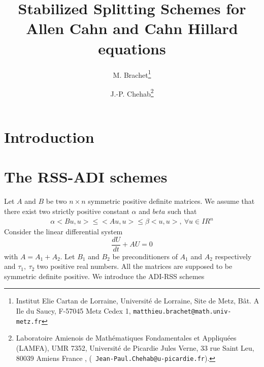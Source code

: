 \documentclass[11pt]{article}
\newcommand{\R}{I\!\!R}
\newcommand{\Frac}[2] {\frac{\textstyle #1} {\textstyle #2}}
\begin{document}
\title{Stabilized Splitting Schemes for Allen Cahn and Cahn Hillard equations}
\author{M. Brachet\thanks{Institut Elie Cartan de Lorraine, Universit\'e de Lorraine, Site de Metz, B\^at. A Ile du Saucy, F-57045 Metz Cedex 1, {\tt matthieu.brachet@math.univ-metz.fr}} \and J.-P. Chehab\thanks{
Laboratoire Amienois de Math\'ematiques Fondamentales et Appliqu\'ees (LAMFA), {\small UMR} 7352,
 Universit\'e de Picardie Jules Verne, 33 rue Saint Leu, 80039 Amiens France
 , ({\tt
 Jean-Paul.Chehab@u-picardie.fr}).} }




\maketitle

%
%



\begin{abstract}
\end{abstract}
\section{Introduction}
\section{The RSS-ADI schemes}
Let $A$ and $B$ be two $n\times n$ symmetric positive definite matrices. We assume that there exist two strictly positive constant $\alpha$ and $beta$ such that
\begin{eqnarray}
\label{Hyp_H}
\alpha <Bu,u> \le <A u, u> \le \beta <u,u>, \ \forall u \in \R^n
\end{eqnarray}
Consider the linear differential system
$$
\Frac{dU}{dt}+AU=0
$$
with $A=A_1+A_2$. Let $B_1$ and $B_2$ be preconditioners of $A_1$ and $A_2$ respectively and $\tau_1, \ \tau_2$ two positive real numbers. All the matrices are supposed to be symmetric definite positive.
We introduce the ADI-RSS schemes
\end{document}
